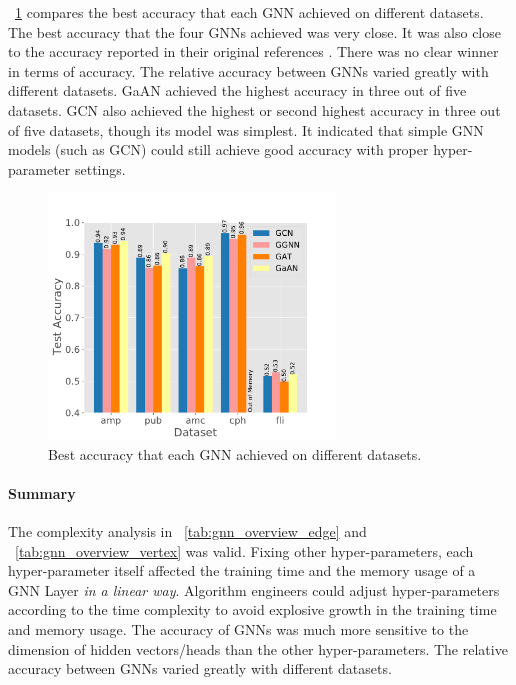 \figurename~\ref{fig:exp_hyperparameter_on_accuracy_alg_contrast} compares the best accuracy that each GNN achieved on different datasets.
%
The best accuracy that the four GNNs achieved was very close.
%
It was also close to the accuracy reported in their original references \cite{kipf2017_gcn,li2015_ggnn,huang2018_gat,zhang2018_gaan}.
%
There was no clear winner in terms of accuracy.
%
The relative accuracy between GNNs varied greatly with different datasets.
%
GaAN achieved the highest accuracy in three out of five datasets.
%
GCN also achieved the highest or second highest accuracy in three out of five datasets, though its model was simplest.
%
It indicated that simple GNN models (such as GCN) could still achieve good accuracy with proper hyper-parameter settings.

\begin{figure}[H]
    \centering
    \includegraphics[width=3in]{figs/experiments/exp_hyperparameter_on_accuracy_alg_contrast.pdf}
    \caption{Best accuracy that each GNN achieved on different datasets.}
    \label{fig:exp_hyperparameter_on_accuracy_alg_contrast}
\end{figure}

\paragraph{Summary}

The complexity analysis in \tablename~\ref{tab:gnn_overview_edge} and \tablename~\ref{tab:gnn_overview_vertex} was valid.
%
Fixing other hyper-parameters, each hyper-parameter itself affected the training time and the memory usage of a GNN Layer \emph{in a linear way}.
%
Algorithm engineers could adjust hyper-parameters according to the time complexity to avoid explosive growth in the training time and memory usage.
%
The accuracy of GNNs was much more sensitive to the dimension of hidden vectors/heads than the other hyper-parameters.
%
The relative accuracy between GNNs varied greatly with different datasets.

